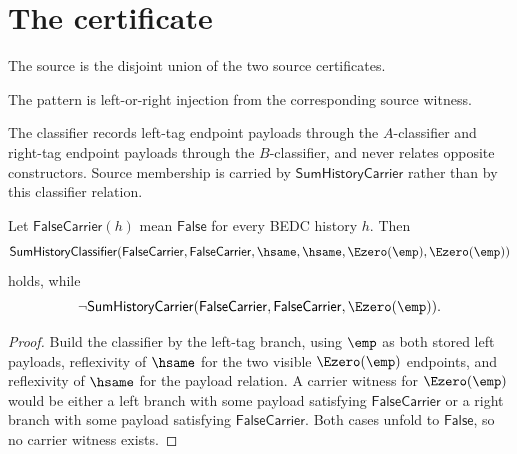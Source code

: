 \section{The certificate}

\begin{definition}
\label{def:sum-source-specification}
The source is the disjoint union of the two source certificates.
\end{definition}

\begin{definition}
\label{def:sum-pattern-specification}
The pattern is left-or-right injection from the corresponding source witness.
\end{definition}

\begin{definition}
\label{def:sum-classifier-specification}
The classifier records left-tag endpoint payloads through the \(A\)-classifier and right-tag endpoint payloads through the \(B\)-classifier, and never relates opposite constructors. Source membership is carried by $\mathsf{SumHistoryCarrier}$ rather than by this classifier relation.
\end{definition}

\begin{theorem}
\label{thm:sum-classifier-no-source-membership}
Let $\mathsf{FalseCarrier}(h)$ mean $\mathsf{False}$ for every BEDC history $h$. Then
$$
\mathsf{SumHistoryClassifier}(\mathsf{FalseCarrier},\mathsf{FalseCarrier},\hsame,\hsame,\Ezero(\emp),\Ezero(\emp))
$$
holds, while
$$
\neg \mathsf{SumHistoryCarrier}(\mathsf{FalseCarrier},\mathsf{FalseCarrier},\Ezero(\emp)).
$$
\end{theorem}
\begin{proof}
Build the classifier by the left-tag branch, using $\emp$ as both stored left payloads, reflexivity of $\hsame$ for the two visible $\Ezero(\emp)$ endpoints, and reflexivity of $\hsame$ for the payload relation. A carrier witness for $\Ezero(\emp)$ would be either a left branch with some payload satisfying $\mathsf{FalseCarrier}$ or a right branch with some payload satisfying $\mathsf{FalseCarrier}$. Both cases unfold to $\mathsf{False}$, so no carrier witness exists.
\end{proof}

